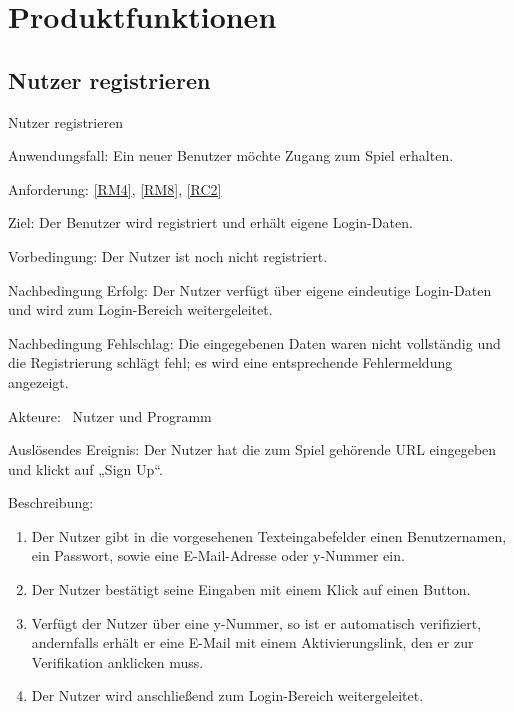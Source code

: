 

\chapter{Produktfunktionen}\label{test1}

\section{Nutzer registrieren}
\begin{function}{10}{Nutzer registrieren}
\item[Anwendungsfall:] Ein neuer Benutzer möchte Zugang zum Spiel erhalten.
\item[Anforderung:] \ref{RM4}, \ref{RM8}, \ref{RC2}
\item[Ziel:] Der Benutzer wird registriert und erhält eigene Login-Daten.
\item[Vorbedingung:] Der Nutzer ist noch nicht registriert.
\item[Nachbedingung Erfolg:] Der Nutzer verfügt über eigene eindeutige Login-Daten und wird zum Login-Bereich weitergeleitet.
\item[Nachbedingung Fehlschlag:] Die eingegebenen Daten waren nicht vollständig und die Registrierung schlägt fehl; es wird eine entsprechende Fehlermeldung angezeigt.
\item[Akteure:] ~Nutzer und Programm
\item[Auslösendes Ereignis:] Der Nutzer hat die zum Spiel gehörende URL eingegeben und klickt auf „Sign Up“.
\item[Beschreibung:] ~
\begin{enumerate}
  \item  Der Nutzer gibt in die vorgesehenen Texteingabefelder einen Benutzernamen, ein Passwort, sowie eine E-Mail-Adresse oder y-Nummer ein.
  \item  Der Nutzer bestätigt seine Eingaben mit einem Klick auf einen Button.
  \item Verfügt der Nutzer über eine y-Nummer, so ist er automatisch verifiziert, andernfalls erhält er eine E-Mail mit einem Aktivierungslink, den er zur Verifikation anklicken muss.
  \item  Der Nutzer wird anschließend zum Login-Bereich weitergeleitet.
\end{enumerate}
\end{function}

